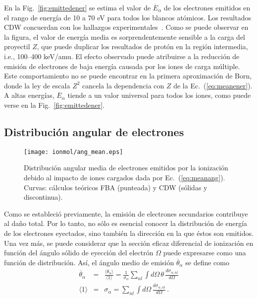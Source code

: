 En la Fig.~\ref{fig:emittedener} se estima el valor de 
$\overline{E}_{\alpha}$ de los electrones emitidos en el rango de 
energía de 10 a 70 eV para todos los blancos atómicos. Los resultados CDW 
concuerdan con los hallazgos experimentales~\cite{Surdutovic:18}. Como 
se puede observar en la figura, el valor de energía media es 
sorprendentemente sensible a la carga del proyectil $Z$, que puede 
duplicar los resultados de protón en la región intermedia, i.e., 
100--400 keV/amu. El efecto observado puede atribuirse a la reducción de
emisión de electrones de baja energía causada por los iones de carga 
múltiple. Este comportamiento no se puede encontrar en la primera 
aproximación de Born, donde la ley de escala $Z^2$ cancela la 
dependencia con $Z$ de la Ec.~(\ref{eq:meanener}). A altas energías, 
$\overline{E}_{\alpha}$ tiende a un valor universal para todos los 
iones, como puede verse en la Fig.~\ref{fig:emittedener}.

\subsection{Distribución angular de electrones}
\label{subsec:meanang}

\begin{figure}
\centering
\texttt{[image: ionmol/ang\_mean.eps]}
\caption[Distribución angular media de electrones emitidos.]
{Distribución angular media de electrones emitidos por la ionización 
debido al impacto de iones cargados dada por Ec.~(\ref{eq:meanang}). 
Curvas: cálculos teóricos FBA (punteada) y CDW (sólidas y 
discontinua).}
\label{fig:emittedang}
\end{figure} 

Como se estableció previamente, la emisión de electrones secundarios 
contribuye al daño total. Por lo tanto, no sólo es esencial conocer la 
distribución de energía de los electrones eyectados, sino también la 
dirección en la que éstos son emitidos. Una vez más, se puede considerar 
que la sección eficaz diferencial de ionización en función del ángulo 
sólido de eyección del electrón $\Omega$ puede expresarse como una 
función de distribución. Así, el ángulo medio de emisión 
$\overline{\theta}_{\alpha}$ se define como 
\begin{eqnarray}
\overline{\theta}_{\alpha}&=&\frac{\langle\theta_{\alpha}\rangle}
{\langle 1\rangle}=\frac{1}{\sigma_{\alpha}}\sum\limits_{nl}
\int d\Omega\,\theta\,\frac{d\sigma_{\alpha,nl}}{d\Omega} 
\label{eq:meanang} \\
\langle 1\rangle &=&\sigma_{\alpha}=\sum\limits_{nl}\int d\Omega\,
\frac{d\sigma_{\alpha,nl}}{d\Omega}\,.
\end{eqnarray}

